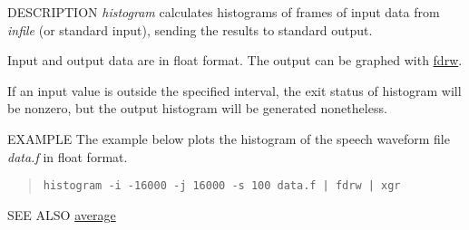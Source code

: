 \begin{synopsis}
\item [histogram] [ --l $L$ ] [ --i $I$ ] [ --j $J$ ] [ --s $S$ ] [ --n ] 
                  [ {\em infile} ] 
\end{synopsis}

\begin{qsection}{DESCRIPTION}
{\em histogram} calculates histograms of frames of input data 
from {\em infile} (or standard input), 
sending the results to standard output.

Input and output data are in float format.
The output can be graphed with \hyperlink{fdrw}{fdrw}.

If an input value is outside the specified interval, 
the exit status of histogram will be nonzero, 
but the output histogram will be generated nonetheless.
\end{qsection}

\begin{options}
\end{options}

\begin{qsection}{EXAMPLE}
The example below plots the histogram of the speech waveform file
{\em data.f} in float format.
\begin{quote}
 \verb!histogram -i -16000 -j 16000 -s 100 data.f | fdrw | xgr!
\end{quote} 
\end{qsection}

\begin{qsection}{SEE ALSO}
\hyperlink{average}{average}
\end{qsection}
